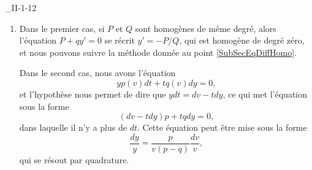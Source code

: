 \begin{corrige}{_II-1-12}
\begin{enumerate}
		\item Dans le premier cas, si $P$ et $Q$ sont homogènes de même degré, alors l'équation $P+qy'=0$ se récrit $y'=-P/Q$, qui est homogène de degré zéro, et nous pouvons suivre la méthode donnée au point \ref{SubSecEqDiffHomo}.

		      Dans le second cas, nous avons l'équation
		      \begin{equation}
			      yp(v)dt+tq(v)dy=0,
		      \end{equation}
		      et l'hypothèse nous permet de dire que $ydt=dv-tdy$, ce qui met l'équation sous la forme
		      \begin{equation}
			      (dv-tdy)p+tqdy=0,
		      \end{equation}
		      dans laquelle il n'y a plus de $dt$. Cette équation peut être mise sous la forme
		      \begin{equation}
			      \frac{ dy }{ y }=\frac{ p }{ v(p-q) }\frac{ dv }{ v },
		      \end{equation}
		      qui se résout par quadrature.

	\end{enumerate}

\end{corrige}

